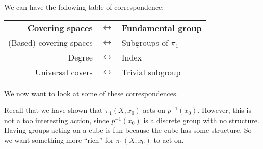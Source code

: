 \documentclass[a4paper]{article}
\begin{document}
We can have the following table of correspondence:
\begin{center}
  \begin{tabular}{rcl}
    \textbf{Covering spaces} & $\longleftrightarrow$ & \textbf{Fundamental group}\\
    (Based) covering spaces & $\longleftrightarrow$ & Subgroups of $\pi_1$\\
    Degree & $\longleftrightarrow$ & Index\\
    Universal covers & $\longleftrightarrow$ & Trivial subgroup\\
  \end{tabular}
\end{center}
We now want to look at some of these correspondences.

Recall that we have shown that $\pi_1(X, x_0)$ acts on $p^{-1}(x_0)$. However, this is not a too interesting action, since $p^{-1}(x_0)$ is a discrete group with no structure. Having groups acting on a cube is fun because the cube has some structure. So we want something more ``rich'' for $\pi_1(X, x_0)$ to act on.
\end{document}

